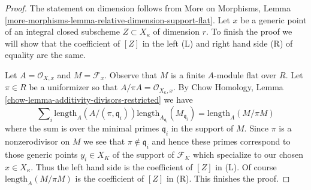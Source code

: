 \documentclass{stacks-project}
\theoremstyle{plain}
\theoremstyle{definition}
\theoremstyle{remark}
\numberwithin{equation}{subsection}
\begin{document}
\begin{proof}
The statement on dimension follows from More on Morphisms, Lemma
\ref{more-morphisms-lemma-relative-dimension-support-flat}.
Let $x$ be a generic point of an integral closed subscheme
$Z \subset X_\kappa$ of dimension $r$. To finish the proof
we will show that the coefficient of $[Z]$
in the left (L) and right hand side (R) of equality are the same.

\medskip\noindent
Let $A = \mathcal{O}_{X, x}$ and $M = \mathcal{F}_x$.
Observe that $M$ is a finite $A$-module flat over $R$.
Let $\pi \in R$ be a uniformizer so that
$A/\pi A = \mathcal{O}_{X_\kappa, x}$.
By Chow Homology, Lemma \ref{chow-lemma-additivity-divisors-restricted}
we have
$$
\sum\nolimits_i \text{length}_A(A/(\pi, \mathfrak q_i))
\text{length}_{A_{\mathfrak q_i}}(M_{\mathfrak q_i}) =
\text{length}_A(M/\pi M)
$$
where the sum is over the minimal primes
$\mathfrak q_i$ in the support of $M$.
Since $\pi$ is a nonzerodivisor on $M$ we see
that $\pi \not \in \mathfrak q_i$ and hence
these primes correspond to those generic points $y_i \in X_K$ of the
support of $\mathcal{F}_K$ which specialize to our chosen $x \in X_\kappa$.
Thus the left hand side is the coefficient of $[Z]$
in (L). Of course $\text{length}_A(M/\pi M)$ is the coefficient
of $[Z]$ in (R). This finishes the proof.
\end{proof}
\end{document}
